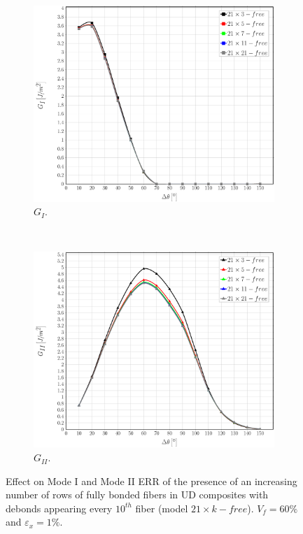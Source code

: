 \documentclass[review]{elsarticle}
\begin{document}
\begin{figure}[!h]
\centering
    \begin{subfigure}[b]{0.475\textwidth}
        \includegraphics[width=\textwidth]{sideabovefibers-vf60-GI.pdf}
        \caption{$G_{I}$.}\label{subfig:sideabovefiber60MIsp}
    \end{subfigure} ~
    \begin{subfigure}[b]{0.475\textwidth}
        \includegraphics[width=\textwidth]{sideabovefibers-vf60-GII.pdf}
        \caption{$G_{II}$.}\label{subfig:sideabovefiber60MIIsp}
    \end{subfigure}

\caption{Effect on Mode I and Mode II ERR of the presence of an increasing number of rows of fully bonded fibers in UD composites with debonds appearing every $10^{th}$ fiber (model $21\times k-free$). $V_{f}=60\%$ and $\varepsilon_{x}=1\%$.}\label{fig:sideabovefibersspacingfixed}
\end{figure}
\end{document}
